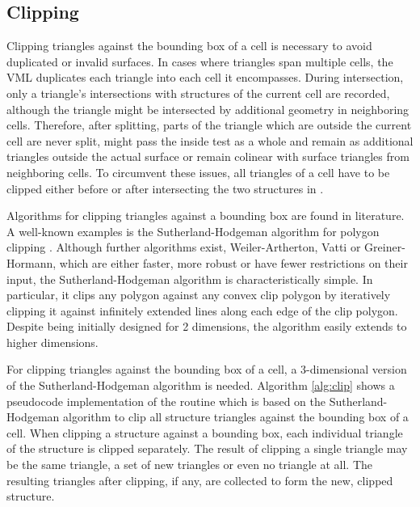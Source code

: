 \subsection{Clipping}
\label{sec:clipping}

Clipping triangles against the bounding box of a cell is necessary to avoid duplicated or invalid surfaces.
In cases where triangles span multiple cells, the VML duplicates each triangle into each cell it encompasses.
During intersection, only a triangle's intersections with structures of the current cell are recorded, although the triangle might be intersected by additional geometry in neighboring cells.
Therefore, after splitting, parts of the triangle which are outside the current cell are never split, might pass the inside test as a whole and remain as additional triangles outside the actual surface or remain colinear with surface triangles from neighboring cells.
To circumvent these issues, all triangles of a cell have to be clipped either before or after intersecting the two structures in .

Algorithms for clipping triangles against a bounding box are found in literature.
A well-known examples is the Sutherland-Hodgeman algorithm for polygon clipping \cite{polygon_clipping}.
Although further algorithms exist, \eg Weiler-Artherton, Vatti or Greiner-Hormann, which are either faster, more robust or have fewer restrictions on their input, the Sutherland-Hodgeman algorithm is characteristically simple.
In particular, it clips any polygon against any convex clip polygon by iteratively clipping it against infinitely extended lines along each edge of the clip polygon.
Despite being initially designed for 2 dimensions, the algorithm easily extends to higher dimensions.

For clipping triangles against the bounding box of a cell, a 3-dimensional version of the Sutherland-Hodgeman algorithm is needed.
Algorithm \ref{alg:clip} shows a pseudocode implementation of the  routine which is based on the Sutherland-Hodgeman algorithm to clip all structure triangles against the bounding box of a cell.
%
When clipping a structure against a bounding box, each individual triangle of the structure is clipped separately.
The result of clipping a single triangle may be the same triangle, a set of new triangles or even no triangle at all.
The resulting triangles after clipping, if any, are collected to form the new, clipped structure.

